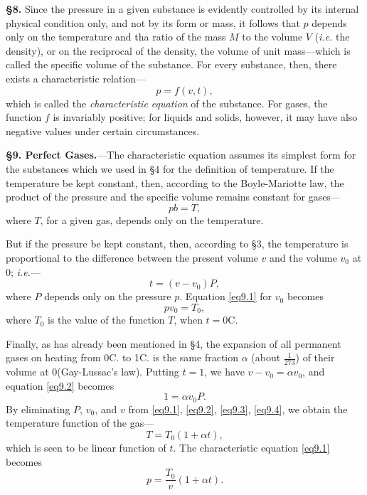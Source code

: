 \documentclass[oneside,12pt]{book}
\begin{document}
\textbf{\S 8.} Since the pressure in a given substance is evidently controlled by its internal physical condition only, and not by its form or mass, it follows that $p$ depends only on the temperature and tha ratio of the mass $M$ to the volume $V$ (\textit{i.e.} the density), or on the reciprocal of the density, the volume of unit mass---which is called the specific volume of the substance. For every substance, then, there exists a characteristic relation---
$$p=f(v,t),$$
which is called the \textit{characteristic equation} of the substance. For gases, the function $f$ is invariably positive; for liquids and solids, however, it may have also negative values under certain circumstances. \par 

\setcounter{equation}{0}
\textbf{\S 9. Perfect Gases.}---The characteristic equation assumes its simplest form for the substances which we used in \S 4 for the definition of temperature. If the temperature be kept constant, then, according to the Boyle-Mariotte law, the product of the pressure and the specific volume remains constant for gases---
\begin{equation}
    pb=T,
    \label{eq9.1}
\end{equation}
where $T$, for a given gas, depends only on the temperature. \par 

But if the pressure be kept constant, then, according to \S 3, the temperature is proportional to the difference between the present volume $v$ and the volume $v_0$ at 0\textdegree; \textit{i.e.}---
\begin{equation}
    t=(v-v_0)P,
    \label{eq9.2}
\end{equation}
where $P$ depends only on the pressure $p$. Equation \eqref{eq9.1} for $v_0$ becomes 
\begin{equation}
    pv_0=T_0,
    \label{eq9.3}
\end{equation}
where $T_0$ is the value of the function $T$, when $t=0$\textdegree C. \par 

Finally, as has already been mentioned in \S 4, the expansion of all permanent gases on heating from 0\textdegree C. to 1\textdegree C. is the same fraction $\alpha$ (about $\frac{1}{273}$) of their volume at 0\textdegree (Gay-Lussac's law). Putting $t=1$, we have $v-v_0=\alpha v_0$, and equation \eqref{eq9.2} becomes 
\begin{equation}
    1=\alpha v_0P. 
    \label{eq9.4}
\end{equation}
By eliminating $P$, $v_0$, and $v$ from \eqref{eq9.1}, \eqref{eq9.2}, \eqref{eq9.3}, \eqref{eq9.4}, we obtain the temperature function of the gas---
$$T=T_0(1+\alpha t),$$
which is seen to be linear function of $t$. The characteristic equation \eqref{eq9.1} becomes 
$$p=\frac{T_0}{v}(1+\alpha t).$$ \par 
\end{document}
